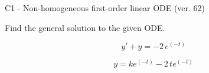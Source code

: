 \begin{exercise}
  \begin{exerciseTitle}C1 - Non-homogeneous first-order linear ODE (ver. 62)\end{exerciseTitle}
  \begin{exerciseStatement}
    
Find the general solution to the given ODE.

    
\[y'+y= -2 \, e^{\left(-t\right)}\]

  \end{exerciseStatement}
  \begin{exerciseAnswer}
    
\[y= k e^{\left(-t\right)} - 2 \, t e^{\left(-t\right)}\]

  \end{exerciseAnswer}
\end{exercise}
